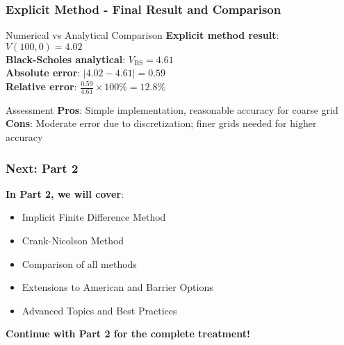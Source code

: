 \documentclass[aspectratio=169]{beamer}
\begin{document}
\begin{frame}
\frametitle{Explicit Method - Final Result and Comparison}
\begin{block}{Numerical vs Analytical Comparison}
\textbf{Explicit method result}: $V(100, 0) = 4.02$\\
\textbf{Black-Scholes analytical}: $V_{\text{BS}} = 4.61$\\
\textbf{Absolute error}: $|4.02 - 4.61| = 0.59$\\
\textbf{Relative error}: $\frac{0.59}{4.61} \times 100\% = 12.8\%$
\end{block}

\begin{block}{Assessment}
\textbf{Pros}: Simple implementation, reasonable accuracy for coarse grid\\
\textbf{Cons}: Moderate error due to discretization; finer grids needed for higher accuracy
\end{block}
\end{frame}

\begin{frame}
\frametitle{Next: Part 2}
\textbf{In Part 2, we will cover}:
\begin{itemize}
\item Implicit Finite Difference Method
\item Crank-Nicolson Method
\item Comparison of all methods
\item Extensions to American and Barrier Options
\item Advanced Topics and Best Practices
\end{itemize}

\textbf{Continue with Part 2 for the complete treatment!}
\end{frame}
\end{document}
